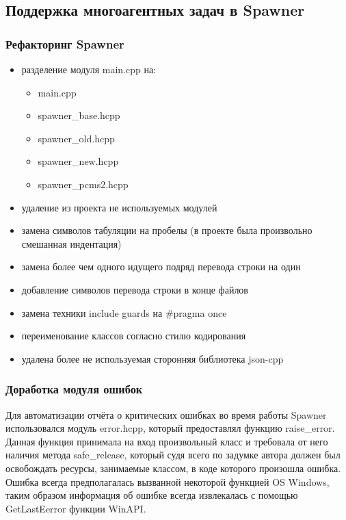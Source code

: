 \documentclass{imcs}
\begin{document}
\subsection{Поддержка многоагентных задач в Spawner}

\subsubsection{Рефакторинг Spawner}
\begin{itemize}
\item разделение модуля main.cpp на:
\begin{itemize}
\item main.cpp
\item spawner\_base.h\/cpp
\item spawner\_old.h\/cpp
\item spawner\_new.h\/cpp
\item spawner\_pcms2.h\/cpp
\end{itemize}
\item удаление из проекта не используемых модулей
\item замена символов табуляции на пробелы (в проекте была произвольно смешанная индентация)
\item замена более чем одного идущего подряд перевода строки на один
\item добавление символов перевода строки в конце файлов
\item замена техники include guards на \#pragma once
\item переименование классов согласно стилю кодирования
\item удалена более не используемая сторонняя библиотека json-cpp
\end{itemize}
\subsubsection{Доработка модуля ошибок}

Для автоматизации отчёта о критических ошибках во время работы Spawner использовался модуль error.h\/cpp, который предоставлял функцию raise\_error. Данная функция принимала на вход произвольный класс и требовала от него наличия метода safe\_release, который судя всего по задумке автора должен был освобождать ресурсы, занимаемые классом, в коде которого произошла ошибка. Ошибка всегда предполагалась вызванной некоторой функцией OS Windows, таким образом информация об ошибке всегда извлекалась с помощью GetLastEerror функции WinAPI.
\end{document}
